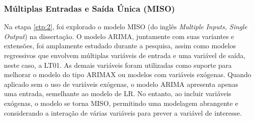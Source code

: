 \subsubsection{M\'ultiplas Entradas e Sa\'ida \'Unica (MISO)}

Na etapa \ref{etp:2}, foi explorado o modelo MISO (do inglês \textit{Multiple Inputs, Single Output}) na dissertação. O modelo ARIMA, juntamente com suas variantes e extensões, foi amplamente estudado durante a pesquisa, assim como modelos regressivos que envolvem múltiplas variáveis de entrada e uma variável de saída, neste caso, a LT01. As demais variáveis foram utilizadas como suporte para melhorar o modelo do tipo ARIMAX ou modelos com variáveis exógenas. Quando aplicado sem o uso de variáveis exógenas, o modelo ARIMA apresenta apenas uma entrada, semelhante ao modelo de LR. No entanto, ao incluir variáveis exógenas, o modelo se torna MISO, permitindo uma modelagem  abrangente e considerando a interação de várias variáveis para prever a variável de interesse.